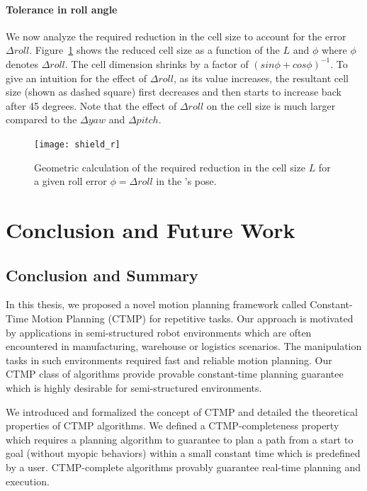 \documentclass[a4paper]{report}
\begin{document}

\subsubsection{Tolerance in roll angle}
We now analyze the required reduction in the cell size to account for the error $\Delta roll$. Figure~\ref{fig:shield_r} shows the reduced cell size as a function of the $L$ and $\phi$ where $\phi$ denotes $\Delta roll$. The cell dimension shrinks by a factor of $(sin \phi + cos \phi)^{-1}$. To give an intuition for the effect of $\Delta roll$, as its value increases, the resultant cell size (shown as dashed square) first decreases and then starts to increase back after 45 degrees. Note that the effect of $\Delta roll$ on the cell size is much larger compared to the $\Delta yaw$ and $\Delta pitch$.

\begin{figure}[H]
\centering
 \texttt{[image: shield\_r]}
\caption{Geometric calculation of the required reduction in the cell size $L$ for a given roll error $\phi = \Delta roll$ in the \calS's pose.}
\label{fig:shield_r}
\end{figure}

\newpage

\chapter{Conclusion and Future Work}
\section{Conclusion and Summary}
In this thesis, we proposed a novel motion planning framework called Constant-Time Motion Planning (CTMP) for repetitive tasks. Our approach is motivated by applications in semi-structured robot environments which are often encountered in manufacturing, warehouse or logistics scenarios. The manipulation tasks in such environments required fast and reliable motion planning. Our CTMP class of algorithms provide provable constant-time planning guarantee which is highly desirable for semi-structured environments.

We introduced and formalized the concept of CTMP and detailed the theoretical properties of CTMP algorithms. We defined a CTMP-completeness property which requires a planning algorithm to guarantee to plan a path from a start to goal (without myopic behaviors) within a small constant time which is predefined by a user. CTMP-complete algorithms provably guarantee real-time planning and execution.
\end{document}
